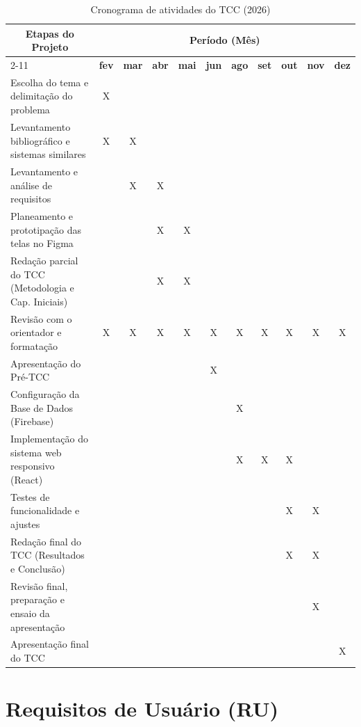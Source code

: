 \begin{table}[H]
\centering
\caption{Cronograma de atividades do TCC (2026)}
\label{quadro:cronograma}
\renewcommand{\arraystretch}{1.3} 
\setlength{\tabcolsep}{4pt} 
\small 
\begin{tabular}{|p{4.5cm}|c|c|c|c|c|c|c|c|c|c|}
\hline

\multicolumn{1}{|c|}{\textbf{Etapas do Projeto}} & \multicolumn{10}{c|}{\textbf{Período (Mês)}} \\ \cline{2-11} 
 & \textbf{fev} & \textbf{mar} & \textbf{abr} & \textbf{mai} & \textbf{jun} & \textbf{ago} & \textbf{set} & \textbf{out} & \textbf{nov} & \textbf{dez} \\ \hline

Escolha do tema e delimitação do problema & X & & & & & & & & & \\ \hline
Levantamento bibliográfico e sistemas similares & X & X & & & & & & & & \\ \hline
Levantamento e análise de requisitos & & X & X & & & & & & & \\ \hline
Planeamento e prototipação das telas no Figma & & & X & X & & & & & & \\ \hline
Redação parcial do TCC (Metodologia e Cap. Iniciais) & & & X & X & & & & & & \\ \hline
Revisão com o orientador e formatação & X & X & X & X & X & X & X & X & X & X \\ \hline
Apresentação do Pré-TCC & & & & & X & & & & & \\ \hline
Configuração da Base de Dados (Firebase) & & & & & & X & & & & \\ \hline
Implementação do sistema web responsivo (React) & & & & & & X & X & X & & \\ \hline
Testes de funcionalidade e ajustes & & & & & & & & X & X & \\ \hline
Redação final do TCC (Resultados e Conclusão) & & & & & & & & X & X & \\ \hline
Revisão final, preparação e ensaio da apresentação & & & & & & & & & X & \\ \hline
Apresentação final do TCC & & & & & & & & & & X \\ \hline
\end{tabular}

\vspace{0.2cm}
\end{table}

\section{Requisitos de Usuário (RU)}

